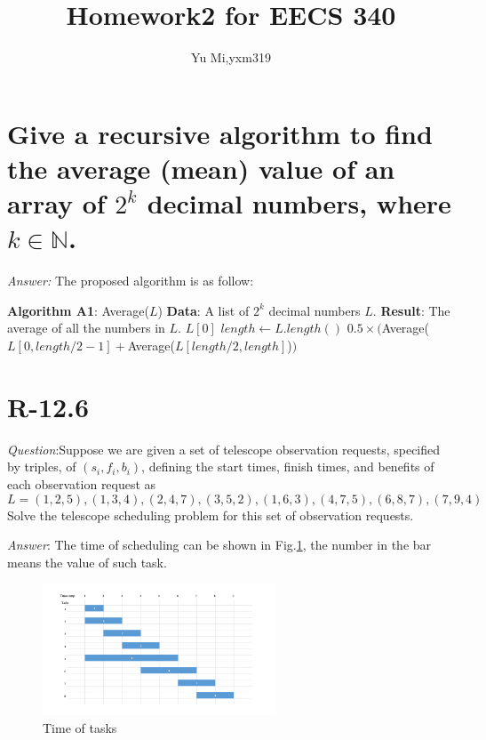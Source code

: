 \documentclass[11pt]{article}
\begin{document}
	\title{Homework2 for EECS 340}
	\author{Yu Mi,yxm319}
	\maketitle
\section{Give a recursive algorithm to find the average (mean) value of an array of $2^k$ decimal numbers, where $k\in \mathbb{N}$.}
	\emph{Answer:} The proposed algorithm is as follow:
	
	\begin{algorithmic}
	\State \textbf{Algorithm A1}: Average($L$)
	\State \textbf{Data}: A list of $2^k$ decimal numbers $L$.
	\State \textbf{Result}: The average of all the numbers in $L$.
		\State \Return $L[0]$
	\Else
		\State $length\gets L.length()$
		\State \Return $0.5\times$$($Average($L[0,length/2-1]+$Average($L[length/2,length]$)$)$
	\EndIf
	\end{algorithmic}
\section{R-12.6}
	\emph{Question}:Suppose we are given a set of telescope observation requests, specified by triples, of $(s_i, f_i, b_i)$, defining the start times, finish times, and benefits of each observation request as
	\begin{equation*}
		L={(1,2,5),(1,3,4),(2,4,7), (3,5,2), (1,6,3), (4,7,5), (6,8,7), (7,9,4)}
	\end{equation*}
	Solve the telescope scheduling problem for this set of observation requests.
	
\noindent	\emph{Answer}: The time of scheduling can be shown in Fig.\ref{fig:fig1}, the number in the bar means the value of such task. 
	\begin{figure}[h]
		\centering
		\includegraphics[width=0.62\textwidth]{Figure/FG1.png}
		\caption{Time of tasks}
		\label{fig:fig1}
	\end{figure}
	
\end{document}
